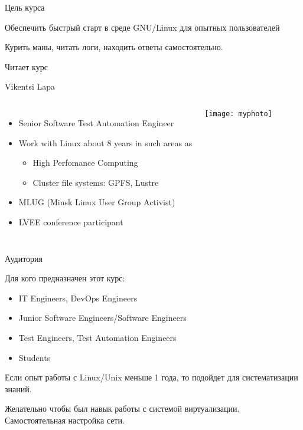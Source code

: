\begin{frame}{Цель курса}
	\begin{center}
		\Huge
		Обеспечить быстрый старт в среде GNU/Linux для опытных пользователей
	\end{center}
    \pause
    Курить маны, читать логи, находить ответы самостоятельно.
\end{frame}

\begin{frame}{Читает курс}

    \large Vikentsi Lapa 
    \begin{columns}
            \begin{itemize}
                \item Senior Software Test Automation Engineer
                \item Work with Linux about 8 years in such areas as
                \begin{itemize}
                    \item High Perfomance Computing
                    \item Cluster file systems: GPFS, Lustre 
                \end{itemize}
                \item MLUG (Minsk Linux User Group Activist)
                \item LVEE conference participant 
            \end{itemize}
            \center\texttt{[image: myphoto]}
    \end{columns}
\end{frame}

\begin{frame}{Аудитория}

Для кого предназначен этот курс:
\begin{itemize}
    \item IT Engineers, DevOps Engineers
    \item Junior Software Engineers/Software Engineers
    \item Test Engineers, Test Automation Engineers
    \item Students
\end{itemize}

Если опыт работы с Linux/Unix меньше 1 года, то подойдет для систематизации знаний.

Желательно чтобы был навык работы с системой виртуализации. Самостоятельная настройка сети.

\end{frame}

